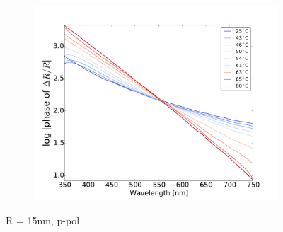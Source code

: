 \begin{figure}
    \begin{subfigure}[b]{0.3\textwidth}
        \centering
        \includegraphics[width=\textwidth]{Results/Sim3/dRphase_visible_log.pdf}
        \caption{}
    \end{subfigure}
    \caption{R = 15nm, p-pol}
\end{figure}
%
